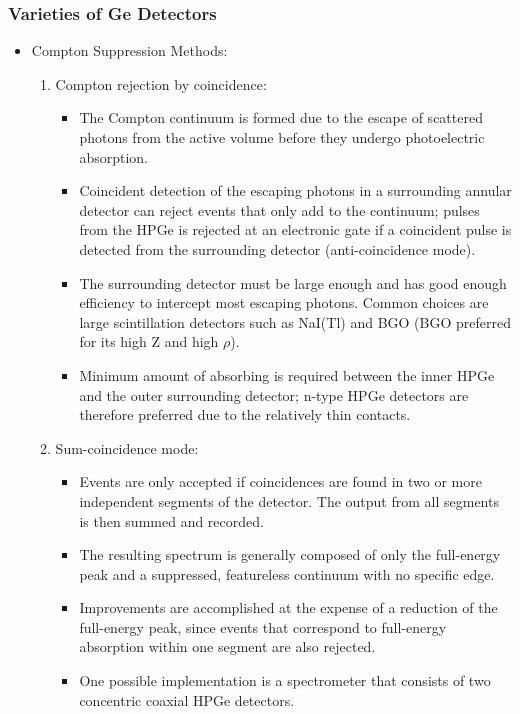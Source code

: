 \subsubsection{Varieties of Ge Detectors}
\begin{itemize}
    \item Compton Suppression Methods:
    \begin{enumerate}
        \item Compton rejection by coincidence:
        \begin{itemize}
            \item The Compton continuum is formed due to the escape of scattered photons from the active volume before they undergo photoelectric absorption.
            \item Coincident detection of the escaping photons in a surrounding annular detector can reject events that only add to the continuum; pulses from the HPGe is rejected at an electronic gate if a coincident pulse is detected from the surrounding detector (anti-coincidence mode).
            \item The surrounding detector must be large enough and has good enough efficiency to intercept most escaping photons. Common choices are large scintillation detectors such as NaI(Tl) and BGO (BGO preferred for its high Z and high $\rho$). 
            \item Minimum amount of absorbing is required between the inner HPGe and the outer surrounding detector; n-type HPGe detectors are therefore preferred due to the relatively thin contacts. 
        \end{itemize}
        \item Sum-coincidence mode:
        \begin{itemize}
            \item Events are only accepted if coincidences are found in two or more independent segments of the detector. The output from all segments is then summed and recorded. 
            \item The resulting spectrum is generally composed of only the full-energy peak and a suppressed, featureless continuum with no specific edge.
            \item Improvements are accomplished at the expense of a reduction of the full-energy peak, since events that correspond to full-energy absorption within one segment are also rejected. 
            \item One possible implementation is a spectrometer that consists of two concentric coaxial HPGe detectors. 

\end{itemize}
\end{enumerate}
\end{itemize}
